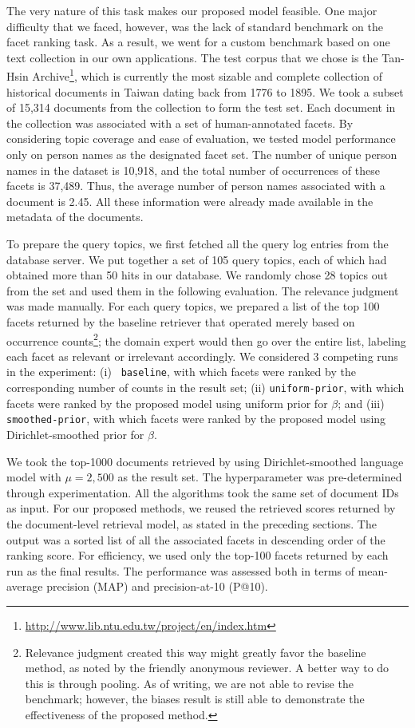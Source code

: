 The very nature of this task makes our proposed model feasible.  One major
difficulty that we faced, however, was the lack of standard benchmark on the
facet ranking task.  As a result, we went for a custom benchmark based on one
text collection in our own applications.  The test corpus that we chose is the
Tan-Hsin
Archive\footnote{\url{http://www.lib.ntu.edu.tw/project/en/index.htm}}, which
is currently the most sizable and complete collection of historical documents
in Taiwan dating back from 1776 to 1895.  We took a subset of 15,314 documents
from the collection to form the test set.  Each document in the collection was
associated with a set of human-annotated facets.  By considering topic coverage
and ease of evaluation, we tested model performance only on person names as the
designated facet set.  The number of unique person names in the dataset is
10,918, and the total number of occurrences of these facets is 37,489.  Thus,
the average number of person names associated with a document is 2.45.  All
these information were already made available in the metadata of the documents.  

To prepare the query topics, we first fetched all the query log entries from
the database server.  We put together a set of 105 query topics, each of which
had obtained more than 50 hits in our database.  We randomly chose 28 topics
out from the set and used them in the following evaluation.  The relevance
judgment was made manually.  For each query topics, we prepared a list of the
top 100 facets returned by the baseline retriever that operated merely based on
occurrence counts\footnote{Relevance judgment created this way might greatly
favor the baseline method, as noted by the friendly anonymous reviewer.  A
better way to do this is through pooling.  As of writing, we are not able to
revise the benchmark; however, the biases result is still able to demonstrate
the effectiveness of the proposed method.}; the domain expert would then go
over the entire list, labeling each facet as relevant or irrelevant
accordingly.  We considered 3 competing runs in the experiment: (i) {\tt
baseline}, with which facets were ranked by the corresponding number of counts
in the result set; (ii) {\tt uniform-prior}, with which facets were ranked by
the proposed model using uniform prior for $\beta$; and (iii) {\tt
smoothed-prior}, with which facets were ranked by the proposed model using
Dirichlet-smoothed prior for $\beta$. 

We took the top-1000 documents retrieved by using Dirichlet-smoothed language
model with $\mu = 2,500$ as the result set.  The hyperparameter was
pre-determined through experimentation.  All the algorithms took the same set
of document IDs as input.  For our proposed methods, we reused the retrieved
scores returned by the document-level retrieval model, as stated in the
preceding sections.  The output was a sorted list of all the associated facets
in descending order of the ranking score.  For efficiency, we used only the
top-100 facets returned by each run as the final results.  The performance was
assessed both in terms of mean-average precision (MAP) and precision-at-10
(P@10).  

